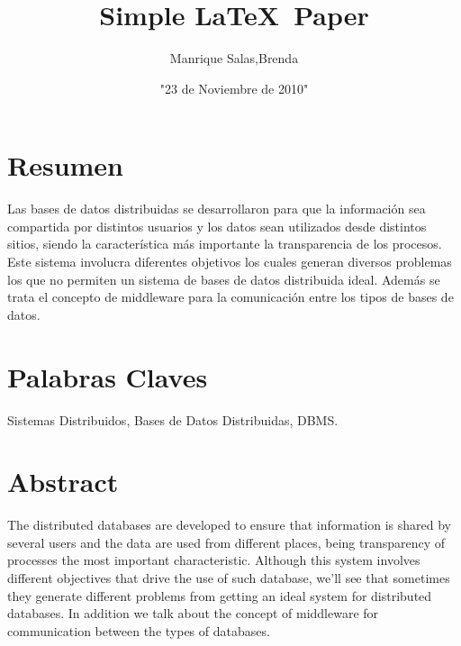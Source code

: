 \documentclass[10pt,a4paper,oneside]{article}
\title{ Simple \LaTeX\ Paper}
\author{Manrique Salas,Brenda }
\date{"23 de Noviembre de 2010"}
\begin{document}
\maketitle


\section*{Resumen}\begin{flushright}
\begin{flushright}
\begin{flushright}
\begin{flushright}
\begin{flushright}
\begin{flushright}
\end{flushright}
\end{flushright}
\end{flushright}
\end{flushright}
\end{flushright}
\end{flushright}
Las bases de datos distribuidas se desarrollaron para que la informaci\'on sea compartida por distintos usuarios y los datos sean utilizados desde distintos sitios, siendo la caracter\'istica m\'as importante la transparencia de los procesos. Este sistema involucra diferentes objetivos los cuales generan diversos problemas los que no permiten un sistema de bases de datos distribuida ideal. Adem\'as se trata el concepto de middleware para la comunicaci\'on entre los tipos de bases de datos.

\section*{Palabras Claves}
Sistemas Distribuidos, Bases de Datos Distribuidas, DBMS.

\section*{Abstract}
The distributed databases are developed to ensure that information is shared by several users and the data are used from different places, being transparency of processes the most important characteristic. Although this system involves different objectives that drive the use of such database, we’ll see that sometimes they generate different problems from getting an ideal system for distributed databases. In addition we talk about the concept of middleware for communication between the types of databases.
\end{document}
